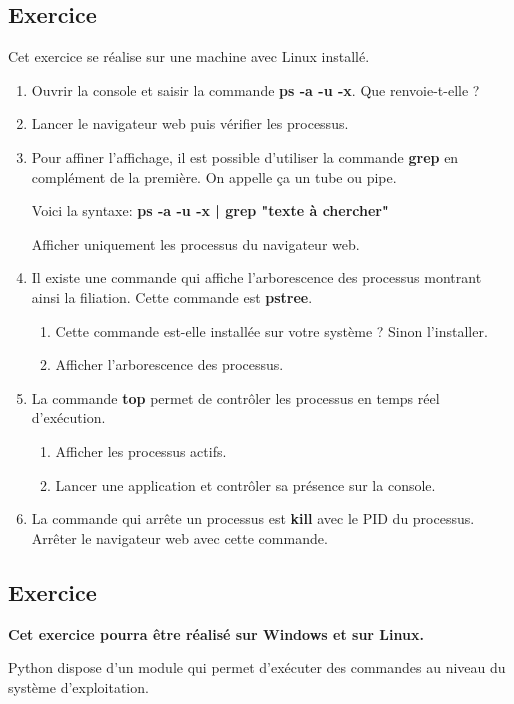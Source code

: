 \documentclass[11pt,a4paper]{article}
\newcounter{numexo}
\begin{document}
\subsection*{\Large Exercice \thenumexo}
Cet exercice se réalise sur une machine avec Linux installé.
\begin{enumerate}
\item Ouvrir la console et saisir la commande \textbf{ps -a -u -x}. Que renvoie-t-elle ?
\item Lancer le navigateur web puis vérifier les processus.
\item Pour affiner l'affichage, il est possible d'utiliser la commande \textbf{grep} en complément de la première. On appelle ça un tube ou pipe. 

Voici la syntaxe: \textbf{ps -a -u -x | grep "texte à chercher"}

Afficher uniquement les processus du navigateur web.
\item Il existe une commande qui affiche l'arborescence des processus montrant ainsi la filiation. Cette commande est \textbf{pstree}.
\begin{enumerate}
\item Cette commande est-elle installée sur votre système ? Sinon l'installer.
\item Afficher l'arborescence des processus.
\end{enumerate}
\item La commande \textbf{top} permet de contrôler les processus en temps réel d'exécution.
\begin{enumerate}
\item Afficher les processus actifs.
\item Lancer une application et contrôler sa présence sur la console.
\end{enumerate}
\item La commande qui arrête un processus est \textbf{kill} avec le PID du processus. Arrêter le navigateur web avec cette commande.
\end{enumerate}



\addtocounter{numexo}{1}
\subsection*{\Large Exercice \thenumexo}
\textbf{Cet exercice pourra être réalisé sur Windows et sur Linux.}\bigskip

Python dispose d'un module qui permet d'exécuter des commandes au niveau du système d'exploitation. 
\end{document}
